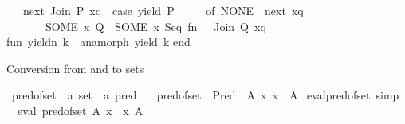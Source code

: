 \begin{isabellebody}
\ \ {\isacharbar}{\kern0pt}\ next\ {\isacharparenleft}{\kern0pt}Join\ {\isacharparenleft}{\kern0pt}P{\isacharcomma}{\kern0pt}\ xq{\isacharparenright}{\kern0pt}{\isacharparenright}{\kern0pt}\ {\isacharequal}{\kern0pt}\ {\isacharparenleft}{\kern0pt}case\ yield\ P\isanewline
\ \ \ \ \ of\ NONE\ {\isacharequal}{\kern0pt}{\isachargreater}{\kern0pt}\ next\ xq\isanewline
\ \ \ \ \ \ {\isacharbar}{\kern0pt}\ SOME\ {\isacharparenleft}{\kern0pt}x{\isacharcomma}{\kern0pt}\ Q{\isacharparenright}{\kern0pt}\ {\isacharequal}{\kern0pt}{\isachargreater}{\kern0pt}\ SOME\ {\isacharparenleft}{\kern0pt}x{\isacharcomma}{\kern0pt}\ Seq\ {\isacharparenleft}{\kern0pt}fn\ {\isacharunderscore}{\kern0pt}\ {\isacharequal}{\kern0pt}{\isachargreater}{\kern0pt}\ Join\ {\isacharparenleft}{\kern0pt}Q{\isacharcomma}{\kern0pt}\ xq{\isacharparenright}{\kern0pt}{\isacharparenright}{\kern0pt}{\isacharparenright}{\kern0pt}{\isacharparenright}{\kern0pt}{\isacharsemicolon}{\kern0pt}\isanewline
\isanewline
fun\ yieldn\ k\ {\isacharequal}{\kern0pt}\ anamorph\ yield\ k{\isacharsemicolon}{\kern0pt}\isanewline
\isanewline
end{\isacharsemicolon}{\kern0pt}\isanewline
{\isacartoucheclose}%
\endisatagML
{\isafoldML}%
%
\isadelimML
%
\endisadelimML
%
\begin{isamarkuptext}%
Conversion from and to sets%
\end{isamarkuptext}\isamarkuptrue%
\isamarkupfalse%
\ pred{\isacharunderscore}{\kern0pt}of{\isacharunderscore}{\kern0pt}set\ {\isacharcolon}{\kern0pt}{\isacharcolon}{\kern0pt}\ {\isachardoublequoteopen}{\isacharprime}{\kern0pt}a\ set\ {\isasymRightarrow}\ {\isacharprime}{\kern0pt}a\ pred{\isachardoublequoteclose}\ \isanewline
\ \ {\isachardoublequoteopen}pred{\isacharunderscore}{\kern0pt}of{\isacharunderscore}{\kern0pt}set\ {\isacharequal}{\kern0pt}\ Pred\ {\isasymcirc}\ {\isacharparenleft}{\kern0pt}{\isasymlambda}A\ x{\isachardot}{\kern0pt}\ x\ {\isasymin}\ A{\isacharparenright}{\kern0pt}{\isachardoublequoteclose}\isanewline
\isanewline
{}\isamarkupfalse%
\ eval{\isacharunderscore}{\kern0pt}pred{\isacharunderscore}{\kern0pt}of{\isacharunderscore}{\kern0pt}set\ {\isacharbrackleft}{\kern0pt}simp{\isacharbrackright}{\kern0pt}{\isacharcolon}{\kern0pt}\isanewline
\ \ {\isachardoublequoteopen}eval\ {\isacharparenleft}{\kern0pt}pred{\isacharunderscore}{\kern0pt}of{\isacharunderscore}{\kern0pt}set\ A{\isacharparenright}{\kern0pt}\ x\ {\isasymlongleftrightarrow}\ x\ {\isasymin}A{\isachardoublequoteclose}\isanewline
%
\isadelimproof
\ \ %
\endisadelimproof
%
\isatagproof
{}\isamarkupfalse%

\end{isabellebody}
